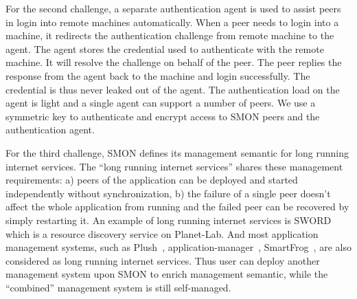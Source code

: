 For the second challenge, a separate authentication agent is
used to assist peers in login into remote machines
automatically. When a peer needs to login into a machine, it
redirects the authentication challenge from remote machine
to the agent. The agent stores the credential used to
authenticate with the remote machine. It will resolve the
challenge on behalf of the peer. The peer replies the
response from the agent back to the machine and login
successfully. The credential is thus never leaked out of the
agent. The authentication load on the agent is light and a
single agent can support a number of peers.  We use a
symmetric key to authenticate and encrypt access to SMON
peers and the authentication agent.

For the third challenge, SMON defines its management
semantic for long running internet services. The ``long
running internet services'' shares these management
requirements: a) peers of the application can be deployed
and started independently without synchronization, b) the
failure of a single peer doesn't affect the whole
application from running and the failed peer can be
recovered by simply restarting it. An example of long
running internet services is SWORD~\cite{sword_toit} which
is a resource discovery service on Planet-Lab.
And most application management systems, such as
Plush~\cite{Albrecht2007},
application-manager~\cite{appmanager},
SmartFrog~\cite{smartfrog}, are also considered as long
running internet services. Thus user can deploy another
management system upon SMON to enrich management semantic,
while the ``combined'' management system is still
self-managed.



